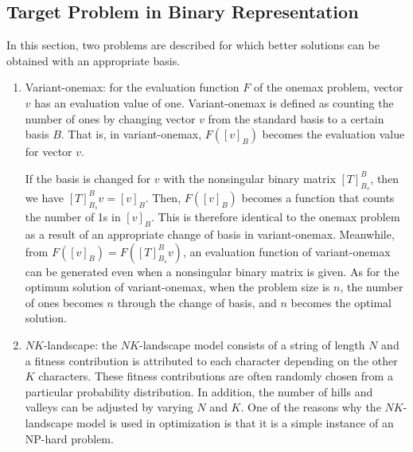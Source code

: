 \subsection{Target Problem in Binary Representation}
In this section, two problems are described for which better solutions can be obtained with an appropriate basis.
\begin{enumerate}
	\item  Variant-onemax: for the evaluation function $ F $ of the onemax problem, vector $ v $ has an evaluation value of one. Variant-onemax is defined as counting the number of ones by changing vector $ v $ from the standard basis to a certain basis $ B $. That is, in variant-onemax, $ F\left(\left[v\right]_B\right) $ becomes the evaluation value for vector $ v $.
	
	If the basis is changed for $ v $ with the nonsingular binary matrix $ \left[T\right]_{B_s}^B $, then we have $ \left[T\right]_{B_s}^B v=\left[v\right]_B $. Then, $ F\left(\left[v\right]_B\right) $ becomes a function that counts the number of 1s in $ \left[v\right]_B $. This is therefore identical to the onemax problem as a result of an appropriate change of basis in variant-onemax. Meanwhile, from $ F\left(\left[v\right]_B\right)=F\left(\left[T\right]_{B_s}^Bv\right) $, an evaluation function of variant-onemax can be generated even when a nonsingular binary matrix is given. As for the optimum solution of variant-onemax, when the problem size is $ n $, the number of ones becomes $ n $ through the change of basis, and $ n $ becomes the optimal solution.
	
	\item $ NK $-landscape: the $ NK $-landscape model consists of a string of length $ N $ and a fitness contribution is attributed to each character depending on the other $ K $ characters. These fitness contributions are often randomly chosen from a particular probability distribution. In addition, the number of hills and valleys can be adjusted by varying $ N $ and $ K $. One of the reasons why the $ NK $-landscape model is used in optimization is that it is a simple instance of an NP-hard problem.
	
\end{enumerate}

